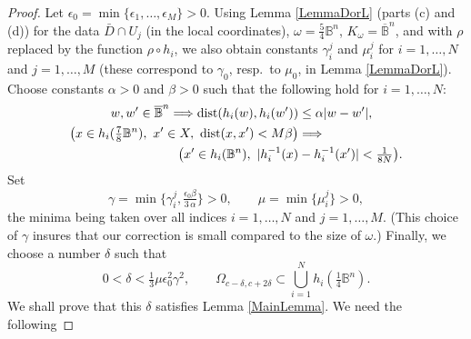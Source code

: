 \documentclass[11pt]{amsart}
\numberwithin{equation}{section}
\theoremstyle{definition}
\begin{document}
\begin{proof}
Let ${\epsilon}_0=\min\{{\epsilon}_1,\ldots,{\epsilon}_M\}>0$. 
Using Lemma \ref{LemmaDorL} (parts (c) and (d)) 
for the data $\bar D\cap U_j$ (in the local coordinates), 
$\omega=\tfrac54{\mathbb{B}}^n$, $K_\omega=\overline {\mathbb{B}}^n$, and with $\rho$ 
replaced  by the function $\rho\circ h_i$, we also obtain constants 
$\gamma_i^j$ and $\mu_i^j$ for $i=1,\ldots,N$ and $j=1,\ldots,M$ 
(these correspond to $\gamma_0$, resp.\ to $\mu_0$, 
in Lemma \ref{LemmaDorL}). 
Choose constants $\alpha>0$ and $\beta>0$ such that 
the following hold for  $i=1,\ldots,N$:
\begin{align}
	w,w'\in\overline {\mathbb{B}}^n \Longrightarrow {\rm dist}(h_i(w),h_i(w')) 
			&\le \alpha|w-w'|,\label{defalpha}\\
	\bigl( x\in h_i(\tfrac78{\mathbb{B}}^n),\ x'\in X,\ {\rm dist}(x,x')<M\beta \bigr)
	&  \Longrightarrow \label{defLambda}\\
	\bigl( x'\in h_i({\mathbb{B}}^n),\ |h_i^{-1}(x)&-h_i^{-1}(x')| < \tfrac1{8N} \bigr). \nonumber
\end{align}
Set 
\begin{equation}
\label{gamma}
	\gamma=\min\{\gamma_i^j,\tfrac{\epsilon_0\beta}{3\,\alpha}\}>0, 
	\qquad \mu=\min\{\mu_i^j\}>0,
\end{equation}	
the minima being taken over all indices $i=1,\ldots,N$  and  $j=1,\ldots,M$.
(This choice of $\gamma$ insures that our correction is  small 
compared to the size of $\omega$.)
Finally, we choose a number $\delta$ such that  
\begin{equation}
\label{delta}
	0<\delta<\tfrac13 \mu{\epsilon}_0^2\gamma^2,  \qquad                          
	\Omega_{c-\delta,c+2{\delta}} \subset 
	\bigcup_{i=1}^{N}h_i\left(\tfrac14{\mathbb{B}}^n\right).                       
\end{equation}
We shall prove that this $\delta$ satisfies Lemma \ref{MainLemma}.
We need the following


\end{proof}
\end{document}
